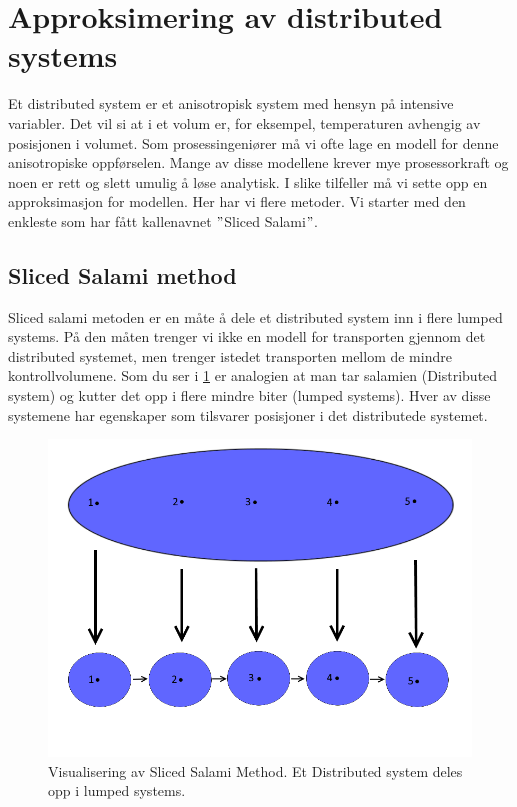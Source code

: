 \clearpage
\section{Approksimering av distributed systems}\label{sec:distributed}
Et distributed system er et anisotropisk system med hensyn på intensive variabler. Det vil si at i et volum er, for eksempel, temperaturen avhengig av posisjonen i volumet. Som prosessingeniører må vi ofte lage en modell for denne anisotropiske oppførselen. Mange av disse modellene krever mye prosessorkraft og noen er rett og slett umulig å løse analytisk. I slike tilfeller må vi sette opp en approksimasjon for modellen. Her har vi flere metoder. Vi starter med den enkleste som har fått kallenavnet $"$Sliced Salami$"$.

\subsection{Sliced Salami method}
Sliced salami metoden er en måte å dele et distributed system inn i flere lumped systems. På den måten trenger vi ikke en modell for transporten gjennom det distributed systemet, men trenger istedet transporten mellom de mindre kontrollvolumene. Som du ser i \cref{fig:Sliced_salami} er analogien at man tar salamien (Distributed system) og kutter det opp i flere mindre biter (lumped systems). Hver av disse systemene har egenskaper som tilsvarer posisjoner i det distributede systemet. 

\begin{figure}[H]
    \centering
    \includegraphics[scale=0.4]{Figures/sliced_salami_method.png}
    \caption{Visualisering av Sliced Salami Method. Et Distributed system deles opp i lumped systems.}
    \label{fig:Sliced_salami}
\end{figure}

